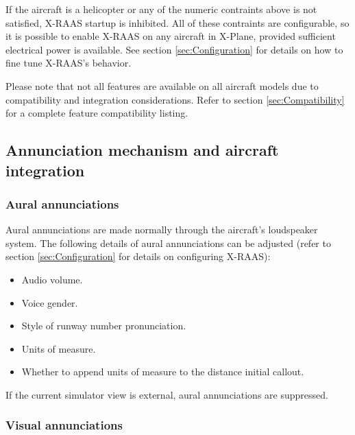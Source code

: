 \documentclass[a4paper,12pt]{article}
\begin{document}
\noindent If the aircraft is a helicopter or any of the numeric
contraints above is not satisfied, X-RAAS startup is inhibited. All of
these contraints are configurable, so it is possible to enable X-RAAS on
any aircraft in X-Plane, provided sufficient electrical power is
available. See section \ref{sec:Configuration} for details on how to fine
tune X-RAAS's behavior.

Please note that not all features are available on all aircraft models
due to compatibility and integration considerations. Refer to section
\ref{sec:Compatibility} for a complete feature compatibility listing.

\subsection{Annunciation mechanism and aircraft integration}
\label{sec:AnnunciationMechanism}

\subsubsection{Aural annunciations}
\label{subsec:AuralAnnunciations}

Aural annunciations are made normally through the aircraft's loudspeaker
system. The following details of aural annunciations can be adjusted
(refer to section \ref{sec:Configuration} for details on configuring X-RAAS):

\begin{itemize}

\item Audio volume.

\item Voice gender.

\item Style of runway number pronunciation.

\item Units of measure.

\item Whether to append units of measure to the distance initial callout.

\end{itemize}

\noindent If the current simulator view is external, aural annunciations
are suppressed.

\subsubsection{Visual annunciations}
\label{subsec:VisualAnnunciations}
\end{document}
